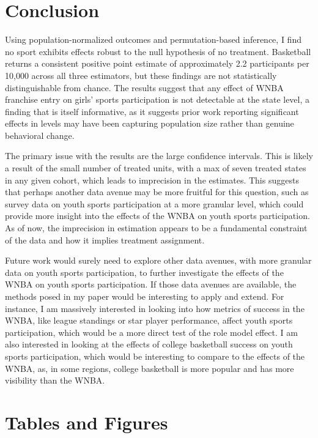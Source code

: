 \documentclass[11pt]{article}
\newcommand{\1}[1]{\mathbb{I}\{#1\}}
\theoremstyle{plain}
\begin{document}
\section{Conclusion}

Using population-normalized outcomes and permutation-based inference, I find no sport exhibits effects robust to the null hypothesis of no treatment. Basketball returns a consistent positive point estimate of approximately 2.2 participants per 10,000 across all three estimators, but these findings are not statistically distinguishable from chance. The results suggest that any effect of WNBA franchise entry on girls' sports participation is not detectable at the state level, a finding that is itself informative, as it suggests prior work reporting significant effects in levels may have been capturing population size rather than genuine behavioral change.

The primary issue with the results are the large confidence intervals. This is likely a result of the small number of treated units, with a max of seven treated states in any given cohort, which leads to imprecision in the estimates. This suggests that perhaps another data avenue may be more fruitful for this question, such as survey data on youth sports participation at a more granular level, which could provide more insight into the effects of the WNBA on youth sports participation. As of now, the imprecision in estimation appears to be a fundamental constraint of the data and how it implies treatment assignment. 

Future work would surely need to explore other data avenues, with more granular data on youth sports participation, to further investigate the effects of the WNBA on youth sports participation. If those data avenues are available, the methods posed in my paper would be interesting to apply and extend. For instance, I am massively interested in looking into how metrics of success in the WNBA, like league standings or star player performance, affect youth sports participation, which would be a more direct test of the role model effect. I am also interested in looking at the effects of college basketball success on youth sports participation, which would be interesting to compare to the effects of the WNBA, as, in some regions, college basketball is more popular and has more visibility than the WNBA.

\newpage


\newpage
  
\section*{Tables and Figures}
\end{document}
